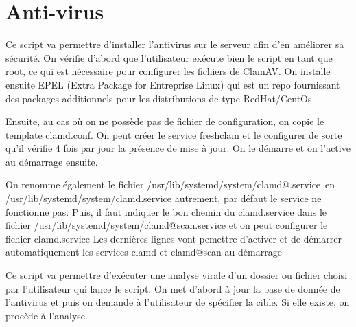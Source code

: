 \section{Anti-virus}

Ce script va permettre d’installer l’antivirus sur le serveur afin d'en améliorer sa sécurité.
On vérifie d’abord que l’utilisateur exécute bien le script en tant que root, ce qui est nécessaire pour configurer les fichiers de ClamAV.
On installe ensuite EPEL (Extra Package for Entreprise Linux) qui est un repo fournissant des packages additionnels pour les distributions de type RedHat/CentOs.

Ensuite, au cas où on ne possède pas de fichier de configuration, on copie le template clamd.conf. On peut créer le service freshclam  et le configurer de sorte qu’il vérifie 4 fois par jour la présence de mise à jour. On le démarre et on l’active au démarrage ensuite.

On renomme également le fichier /usr/lib/systemd/system/clamd@.service en /usr/lib/systemd/system/clamd.service autrement, par défaut le service ne fonctionne pas. Puis, il faut indiquer le bon chemin du clamd.service dans le fichier /usr/lib/systemd/system/clamd@scan.service et on peut configurer le fichier clamd.service
Les dernières lignes vont pemettre d’activer et de démarrer automatiquement les services clamd et clamd@scan au démarrage



Ce script va permettre d’exécuter une analyse virale d’un dossier ou fichier choisi par l’utilisateur qui lance le script.
On met d’abord à jour la base de donnée de l’antivirus et puis on demande à l’utilisateur de spécifier la cible. Si elle existe, on procède à l’analyse.
